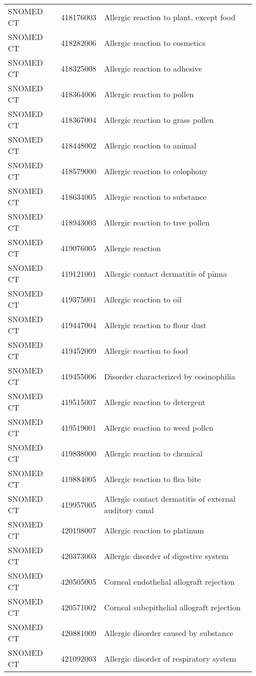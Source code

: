 \begin{longtable}{p{}p{}p{}}
  SNOMED CT & 418176003 & Allergic reaction to plant, except food \\ 
  SNOMED CT & 418282006 & Allergic reaction to cosmetics \\ 
  SNOMED CT & 418325008 & Allergic reaction to adhesive \\ 
  SNOMED CT & 418364006 & Allergic reaction to pollen \\ 
  SNOMED CT & 418367004 & Allergic reaction to grass pollen \\ 
  SNOMED CT & 418448002 & Allergic reaction to animal \\ 
  SNOMED CT & 418579000 & Allergic reaction to colophony \\ 
  SNOMED CT & 418634005 & Allergic reaction to substance \\ 
  SNOMED CT & 418943003 & Allergic reaction to tree pollen \\ 
  SNOMED CT & 419076005 & Allergic reaction \\ 
  SNOMED CT & 419121001 & Allergic contact dermatitis of pinna \\ 
  SNOMED CT & 419375001 & Allergic reaction to oil \\ 
  SNOMED CT & 419447004 & Allergic reaction to flour dust \\ 
  SNOMED CT & 419452009 & Allergic reaction to food \\ 
  SNOMED CT & 419455006 & Disorder characterized by eosinophilia \\ 
  SNOMED CT & 419515007 & Allergic reaction to detergent \\ 
  SNOMED CT & 419519001 & Allergic reaction to weed pollen \\ 
  SNOMED CT & 419838000 & Allergic reaction to chemical \\ 
  SNOMED CT & 419884005 & Allergic reaction to flea bite \\ 
  SNOMED CT & 419957005 & Allergic contact dermatitis of external auditory canal \\ 
  SNOMED CT & 420198007 & Allergic reaction to platinum \\ 
  SNOMED CT & 420373003 & Allergic disorder of digestive system \\ 
  SNOMED CT & 420505005 & Corneal endothelial allograft rejection \\ 
  SNOMED CT & 420571002 & Corneal subepithelial allograft rejection \\ 
  SNOMED CT & 420881009 & Allergic disorder caused by substance \\ 
  SNOMED CT & 421092003 & Allergic disorder of respiratory system \\ 

\end{longtable}
